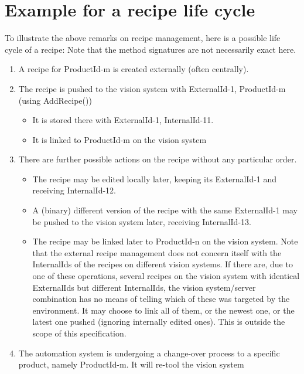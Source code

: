 \appendix

\chapter{Example for a recipe life cycle}
To illustrate the above remarks on recipe management, here is a possible life cycle of a recipe: Note that the 
method signatures are not necessarily exact here. 
\begin{enumerate}
    \item A recipe for ProductId-m is created externally (often centrally). 
    \item The recipe is pushed to the vision system with ExternalId-1, ProductId-m (using AddRecipe())
    \begin{itemize}
        \item It is stored there with ExternalId-1, InternalId-11.
        \item It is linked to ProductId-m on the vision system
    \end{itemize}
    \item There are further possible actions on the recipe without any particular order.
    \begin{itemize}
        \item The recipe may be edited locally later, keeping its ExternalId-1 and receiving InternalId-12.
        \item A (binary) different version of the recipe with the same ExternalId-1 may be pushed to the vision system later, receiving InternalId-13.
        \item The recipe may be linked later to ProductId-n on the vision system. Note that the external recipe 
        management does not concern itself with the InternalIds of the recipes on different vision systems. If 
        there are, due to one of these operations, several recipes on the vision system with identical 
        ExternalIds but different InternalIds, the vision system/server combination has no means of telling 
        which of these was targeted by the environment. It may choose to link all of them, or the newest one, 
        or the latest one pushed (ignoring internally edited ones). This is outside the scope of this specification.
    \end{itemize}
    \item The automation system is undergoing a change-over process to a specific product, namely ProductId-m. It 
    will re-tool the vision system
    \begin{itemize}

\end{itemize}
\end{enumerate}
